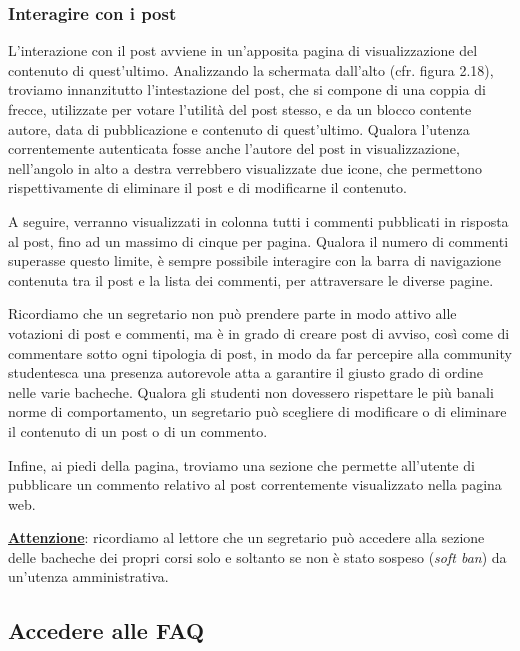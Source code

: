 \documentclass [a4paper,11pt]{book}
\begin{document}
\medskip

\subsubsection{Interagire con i post}

L'interazione con il post avviene in un'apposita pagina di visualizzazione del contenuto di quest'ultimo. Analizzando la schermata dall'alto (cfr. figura 2.18), troviamo innanzitutto l'intestazione del post, che si compone di una coppia di frecce, utilizzate per votare l'utilità del post stesso, e da un blocco contente autore, data di pubblicazione e contenuto di quest'ultimo. Qualora l'utenza correntemente autenticata fosse anche l'autore del post in visualizzazione, nell'angolo in alto a destra verrebbero visualizzate due icone, che permettono rispettivamente di eliminare il post e di modificarne il contenuto.

A seguire, verranno visualizzati in colonna tutti i commenti pubblicati in risposta al post, fino ad un massimo di cinque per pagina. Qualora il numero di commenti superasse questo limite, è sempre possibile interagire con la barra di navigazione contenuta tra il post e la lista dei commenti, per attraversare le diverse pagine. 

Ricordiamo che un segretario non può prendere parte in modo attivo alle votazioni di post e commenti, ma è in grado di creare post di avviso, così come di commentare sotto ogni tipologia di post, in modo da far percepire alla community studentesca una presenza autorevole atta a garantire il giusto grado di ordine nelle varie bacheche. Qualora gli studenti non dovessero rispettare le più banali norme di comportamento, un segretario può scegliere di modificare o di eliminare il contenuto di un post o di un commento.

Infine, ai piedi della pagina, troviamo una sezione che permette all'utente di pubblicare un commento relativo al post correntemente visualizzato nella pagina web.

\medskip

\textbf{\underline{Attenzione}}: ricordiamo al lettore che un segretario può accedere alla sezione delle bacheche dei propri corsi solo e soltanto se non è stato sospeso (\emph{soft ban}) da un'utenza amministrativa.

\medskip

\subsection{Accedere alle FAQ}
\end{document}
